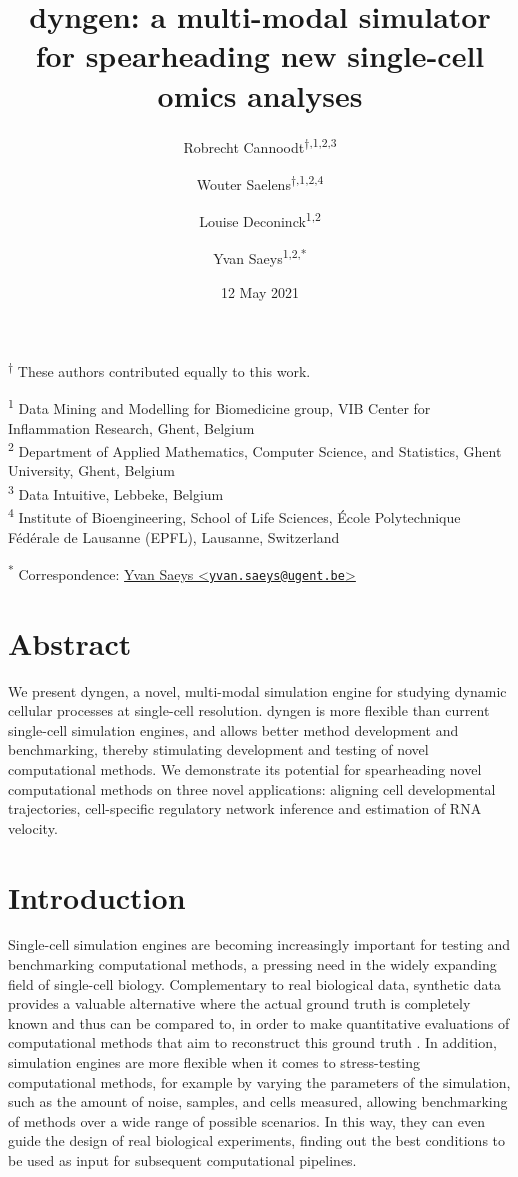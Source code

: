 \documentclass[
  table,
  10pt,
  a4paper]{article}
\title{dyngen: a multi-modal simulator for spearheading new single-cell
omics analyses}
\author{Robrecht Cannoodt\textsuperscript{$\dagger{}$,1,2,3} \and Wouter
Saelens\textsuperscript{$\dagger{}$,1,2,4} \and Louise
Deconinck\textsuperscript{1,2} \and Yvan Saeys\textsuperscript{1,2,*}}
\date{12 May 2021}
\begin{document}
\maketitle

\textsuperscript{$\dagger{}$}
These authors contributed equally to this work.

\textsuperscript{1} Data Mining and Modelling for Biomedicine group, VIB
Center for Inflammation Research, Ghent, Belgium\\
\textsuperscript{2} Department of Applied Mathematics, Computer Science,
and Statistics, Ghent University, Ghent, Belgium\\
\textsuperscript{3} Data Intuitive, Lebbeke, Belgium\\
\textsuperscript{4} Institute of Bioengineering, School of Life
Sciences, École Polytechnique Fédérale de Lausanne (EPFL), Lausanne,
Switzerland

\textsuperscript{*} Correspondence:
\href{mailto:yvan.saeys@ugent.be}{Yvan Saeys
\textless{}\href{mailto:yvan.saeys@ugent.be}{\nolinkurl{yvan.saeys@ugent.be}}\textgreater{}}

\hypertarget{abstract}{%
\section{Abstract}\label{abstract}}

We present dyngen, a novel, multi-modal simulation engine for studying
dynamic cellular processes at single-cell resolution. dyngen is more
flexible than current single-cell simulation engines, and allows better
method development and benchmarking, thereby stimulating development and
testing of novel computational methods. We demonstrate its potential for
spearheading novel computational methods on three novel applications:
aligning cell developmental trajectories, cell-specific regulatory
network inference and estimation of RNA velocity.

\hypertarget{introduction}{%
\section{Introduction}\label{introduction}}

Single-cell simulation engines are becoming increasingly important for
testing and benchmarking computational methods, a pressing need in the
widely expanding field of single-cell biology. Complementary to real
biological data, synthetic data provides a valuable alternative where
the actual ground truth is completely known and thus can be compared to,
in order to make quantitative evaluations of computational methods that
aim to reconstruct this ground truth
\autocite{zappia_splattersimulationsinglecell_2017}. In addition,
simulation engines are more flexible when it comes to stress-testing
computational methods, for example by varying the parameters of the
simulation, such as the amount of noise, samples, and cells measured,
allowing benchmarking of methods over a wide range of possible
scenarios. In this way, they can even guide the design of real
biological experiments, finding out the best conditions to be used as
input for subsequent computational pipelines.
\end{document}
